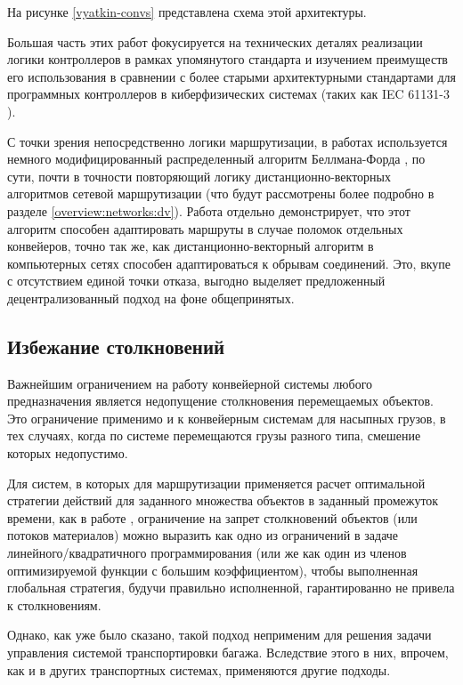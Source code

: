 \documentclass[specification,annotation,times]{itmo-student-thesis}
\theoremstyle{definition}
\begin{document}
На рисунке \ref{vyatkin-convs} представлена схема этой архитектуры.

Большая часть этих работ фокусируется на
технических деталях реализации логики контроллеров в рамках упомянутого
стандарта и изучением преимуществ его использования в сравнении с более старыми
архитектурными стандартами для программных контроллеров в киберфизических
системах (таких как IEC 61131-3 \cite{IEC61131}).

С точки зрения непосредственно
логики маршрутизации, в работах используется немного модифицированный
распределенный алгоритм Беллмана-Форда \cite{bellman-ford}, по сути, почти в
точности повторяющий логику дистанционно-векторных алгоритмов сетевой
маршрутизации (что будут рассмотрены более подробно в разделе
\ref{overview:networks:dv}). Работа \cite{vyatkin-controllers} отдельно
демонстрирует, что этот алгоритм способен адаптировать маршруты в случае поломок
отдельных конвейеров, точно так же, как дистанционно-векторный алгоритм в
компьютерных сетях способен адаптироваться к обрывам соединений. Это, вкупе с
отсутствием единой точки отказа, выгодно выделяет предложенный
децентрализованный подход на фоне общепринятых.

\subsection{Избежание столкновений}\label{overview:collisions}

Важнейшим ограничением на работу конвейерной системы любого предназначения
является недопущение столкновения перемещаемых объектов. Это ограничение
применимо и к конвейерным системам для насыпных грузов, в тех случаях, когда по
системе перемещаются грузы разного типа, смешение которых недопустимо.

Для систем, в которых для маршрутизации применяется расчет оптимальной стратегии
действий для заданного множества объектов в заданный промежуток времени, как в
работе \cite{ago2007simultaneous}, ограничение на запрет столкновений объектов
(или потоков материалов) можно выразить как одно из ограничений в задаче
линейного/квадратичного программирования (или же как один из членов
оптимизируемой функции с большим коэффициентом), чтобы выполненная глобальная
стратегия, будучи правильно исполненной, гарантированно не привела к столкновениям.

Однако, как уже было сказано, такой подход неприменим для решения задачи
управления системой транспортировки багажа. Вследствие этого в них, впрочем, как
и в других транспортных системах, применяются другие подходы.
\end{document}
